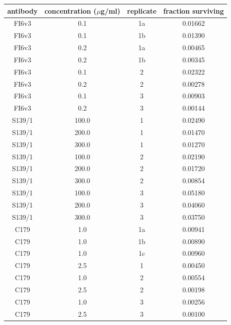 \documentclass[11pt]{article}
\begin{document}
\begin{supptable}
\centering
\begin{tabular}{cccc}
antibody &  concentration ($\mu$g/ml) &  replicate &  fraction surviving \\
\hline
FI6v3 &            0.1 &  1a &             0.01662 \\
 FI6v3 &            0.1 &  1b &             0.01390 \\
FI6v3 &            0.2 &  1a &             0.00465 \\
FI6v3 &            0.2 &  1b &             0.00345 \\
FI6v3 &            0.1 &  2 &             0.02322 \\
FI6v3 &            0.2 &  2 &             0.00278 \\
FI6v3 &            0.1 &  3 &             0.00903 \\
FI6v3 &            0.2 &  3 &             0.00144 \\
S139/1 &          100.0 &  1 &             0.02490 \\
S139/1 &          200.0 &  1 &             0.01470 \\
S139/1 &          300.0 &  1 &             0.01270 \\
S139/1 &          100.0 &  2 &             0.02190 \\
S139/1 &          200.0 &  2 &             0.01720 \\
S139/1 &          300.0 &  2 &             0.00854 \\
S139/1 &          100.0 &  3 &             0.05180 \\
S139/1 &          200.0 &  3 &             0.04060 \\
S139/1 &          300.0 &  3 &             0.03750 \\
C179 &            1.0 &    1a &             0.00941 \\
C179 &            1.0 &    1b &             0.00890 \\
C179 &            1.0 &    1c &             0.00960 \\
C179 &            2.5 &    1 &             0.00450 \\
C179 &            1.0 &    2 &             0.00554 \\
C179 &            2.5 &    2 &             0.00198 \\
C179 &            1.0 &    3 &             0.00256 \\
C179 &            2.5 &    3 &             0.00100 \\
\end{tabular}
\caption{\label{supptab:fracsurvive}
{\bf The total fraction of virions surviving each antibody treatment at each concentration as estimated by qPCR.}
These are the quantities referred to as $\gamma$.
This table shows the values for the broad antibodies; values for the narrow H17-L17, H17-L10, and H17-L7 antibodies are reported in \citet{doud2017complete}.
}
\end{supptable}
\clearpage
\end{document}

